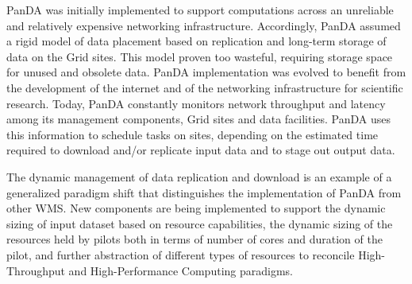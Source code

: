 PanDA was initially implemented to support computations across an unreliable and
relatively expensive networking infrastructure. Accordingly, PanDA assumed a
rigid model of data placement based on replication and long-term storage of data
on the Grid sites. This model proven too wasteful, requiring storage space for
unused and obsolete data. PanDA implementation was evolved to benefit from the
development of the internet and of the networking infrastructure for scientific
research. Today, PanDA constantly monitors network throughput and latency  among
its management components, Grid sites and data facilities. PanDA uses this
information to schedule tasks on sites, depending on the estimated time required
to download and/or replicate input data and to stage out output data.

The dynamic management of data replication and download is an example of a
generalized paradigm shift that distinguishes the implementation of PanDA from
other WMS. New components are being implemented to support the dynamic sizing of
input dataset based on resource capabilities, the dynamic sizing of the
resources held by pilots both in terms of number of cores and duration of the
pilot, and further abstraction of different types of resources to reconcile
High-Throughput and High-Performance Computing paradigms.




%
%


